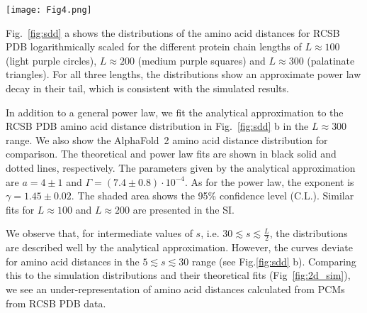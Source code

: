 \documentclass[
reprint,
twocolumn,
amsmath,amssymb,superscriptaddress,aps,
pre]{revtex4-1}
\begin{document}
\begin{figure*}[htb]
        \centering
	\texttt{[image: Fig4.png]}
        \caption{a) Amino acid distance distributions for contact maps derived from the RCSB PDB database for protein chains in the ranges of $L\approx100$, $L\approx200$ and $L\approx300$ amino acids. b) Comparison between the distributions of RCSB PDB and AlphaFold~2 database for protein chains in the $L\approx300$ range. The analytical approximation (solid line) and power law (dashed line) are fitted to the tail of the RCSB data. Pink shaded area shows the 95\% confidence level. c) Secondary structure content distribution in the RCSB PDB and AlphaFold~2 structures in the $L\approx300$ chain length range.}
        \label{fig:sdd}
\end{figure*}

Fig.~\ref{fig:sdd} a shows the distributions of the amino acid distances for RCSB PDB logarithmically scaled for the different protein chain lengths of $L\approx100$ (light purple circles), $L\approx200$ (medium purple squares) and $L\approx300$ (palatinate triangles). For all three lengths, the distributions show an approximate power law decay in their tail, which is consistent with the simulated results. 

In addition to a general power law, we fit the analytical approximation to the RCSB PDB amino acid distance distribution in Fig.~\ref{fig:sdd} b in the $L\approx300$ range. We also show the AlphaFold~2 amino acid distance distribution for comparison. The theoretical and power law fits are shown in black solid and dotted lines, respectively. The parameters given by the analytical approximation are $a=4 \pm 1$ and $\Gamma=(7.4 \pm 0.8)\cdot 10^{-4}$. As for the power law, the exponent is $\gamma=1.45 \pm 0.02$. The shaded area shows the 95\% confidence level (C.L.). Similar fits for $L\approx100$ and $L\approx200$ are presented in the SI.


We observe that, for intermediate values of $s$, i.e. $30\lesssim s\lesssim \frac{L}{2}$, the distributions are described well by the analytical approximation. However, the curves deviate for amino acid distances in the $5\lesssim s \lesssim 30$ range (see Fig.\ref{fig:sdd} b). Comparing this to the simulation distributions and their theoretical fits (Fig~\ref{fig:2d_sim}), we see an under-representation of amino acid distances calculated from PCMs from RCSB PDB data. 
\end{document}

